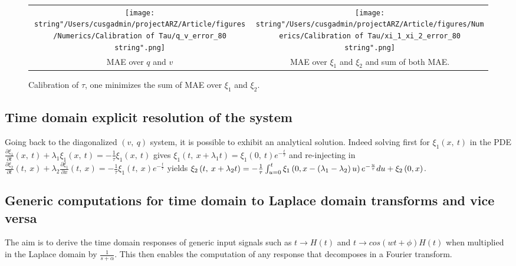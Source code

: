 \documentclass[preprint]{elsarticle}
\begin{document}
\begin{figure}
\begin{centering}
\begin{tabular}{cc}
\texttt{[image: \\string"/Users/cusgadmin/projectARZ/Article/figures/Numerics/Calibration of Tau/q\_v\_error\_80\\string".png]} & \texttt{[image: \\string"/Users/cusgadmin/projectARZ/Article/figures/Numerics/Calibration of Tau/xi\_1\_xi\_2\_error\_80\\string".png]}\tabularnewline
MAE over $q$ and $v$ & MAE over $\xi_{1}$ and $\xi_{2}$ and sum of both MAE.\tabularnewline
\end{tabular}
\par\end{centering}

\protect\caption{Calibration of $\tau$, one minimizes the sum of MAE over $\xi_{1}$
and $\xi_{2}$.}
\end{figure}



\subsection{Time domain explicit resolution of the system \label{sub:Time-domain-explicit}}

Going back to the diagonalized $\left(v,\: q\right)$ system, it is
possible to exhibit an analytical solution. Indeed solving first for
$\xi_{1}\left(x,\: t\right)$ in the PDE $\frac{\partial\xi_{1}}{\partial t}\left(x,\: t\right)+\lambda_{1}\xi_{1}\left(x,\: t\right)=-\frac{1}{\tau}\xi_{1}\left(x,\: t\right)$
gives $\xi_{1}\left(t,\: x+\lambda_{1}t\right)=\xi_{1}\left(0,\: t\right)e^{-\frac{t}{\tau}}$
and re-injecting in $\frac{\partial\xi_{2}}{\partial t}\left(t,\: x\right)+\lambda_{2}\frac{\partial\xi_{1}}{\partial x}\left(t,\: x\right)=-\frac{1}{\tau}\xi_{1}\left(t,\: x\right)e^{-\frac{t}{\tau}}$
yields $\xi_{2}\left(t,\: x+\lambda_{2}t\right)=-\frac{1}{\tau}\intop_{u=0}^{t}\xi_{1}\left(0,x-\left(\lambda_{1}-\lambda_{2}\right)u\right)e^{-\frac{u}{\tau}}du+\xi_{2}\left(0,x\right)$.


\subsection{Generic computations for time domain to Laplace domain transforms
and vice versa\label{sub:Generic-computations}}

The aim is to derive the time domain responses of generic input signals
such as $t\rightarrow H\left(t\right)$ and $t\rightarrow cos\left(wt+\phi\right)H\left(t\right)$
when multiplied in the Laplace domain by $\frac{1}{s+\alpha}$. This
then enables the computation of any response that decomposes in a
Fourier transform.
\end{document}
